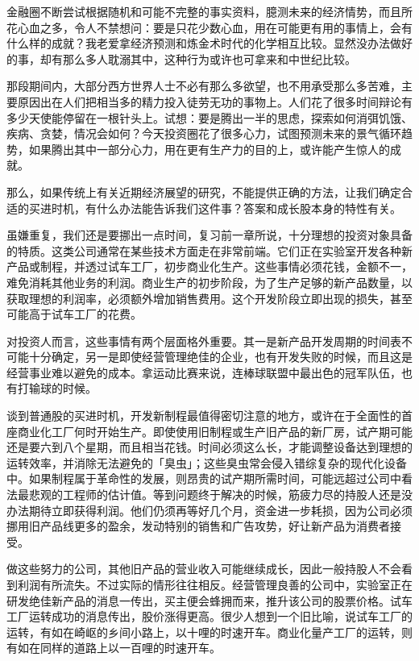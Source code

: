 \documentclass[UTF8,a4paper,zihao=-4,fontset = windows]{ctexart} %
\begin{document}
金融圈不断尝试根据随机和可能不完整的事实资料，臆测未来的经济情势，而且所花心血之多，令人不禁想问：要是只花少数心血，用在可能更有用的事情上，会有什么样的成就？我老爱拿经济预测和炼金术时代的化学相互比较。显然没办法做好的事，却有那么多人耽溺其中，这种行为或许也可拿来和中世纪比较。

那段期间内，大部分西方世界人士不必有那么多欲望，也不用承受那么多苦难，主要原因出在人们把相当多的精力投入徒劳无功的事物上。人们花了很多时间辩论有多少天使能停留在一根针头上。试想：要是腾出一半的思虑，探索如何消弭饥饿、疾病、贪婪，情况会如何？今天投资圈花了很多心力，试图预测未来的景气循环趋势，如果腾出其中一部分心力，用在更有生产力的目的上，或许能产生惊人的成就。

那么，如果传统上有关近期经济展望的研究，不能提供正确的方法，让我们确定合适的买进时机，有什么办法能告诉我们这件事？答案和成长股本身的特性有关。

虽嫌重复，我们还是要挪出一点时间，复习前一章所说，十分理想的投资对象具备的特质。这类公司通常在某些技术方面走在非常前端。它们正在实验室开发各种新产品或制程，并透过试车工厂，初步商业化生产。这些事情必须花钱，金额不一，难免消耗其他业务的利润。商业生产的初步阶段，为了生产足够的新产品数量，以获取理想的利润率，必须额外增加销售费用。这个开发阶段立即出现的损失，甚至可能高于试车工厂的花费。

对投资人而言，这些事情有两个层面格外重要。其一是新产品开发周期的时间表不可能十分确定，另一是即使经营管理绝佳的企业，也有开发失败的时候，而且这是经营事业难以避免的成本。拿运动比赛来说，连棒球联盟中最出色的冠军队伍，也有打输球的时候。

谈到普通股的买进时机，开发新制程最值得密切注意的地方，或许在于全面性的首座商业化工厂何时开始生产。即使使用旧制程或生产旧产品的新厂房，试产期可能还是要六到八个星期，而且相当花钱。时间必须这么长，才能调整设备达到理想的运转效率，并消除无法避免的「臭虫」；这些臭虫常会侵入错综复杂的现代化设备中。如果制程属于革命性的发展，则昂贵的试产期所需时间，可能远超过公司中看法最悲观的工程师的估计值。等到问题终于解决的时候，筋疲力尽的持股人还是没办法期待立即获得利润。他们仍须再等好几个月，资金进一步耗损，因为公司必须挪用旧产品线更多的盈余，发动特别的销售和广告攻势，好让新产品为消费者接受。

做这些努力的公司，其他旧产品的营业收入可能继续成长，因此一般持股人不会看到利润有所流失。不过实际的情形往往相反。经营管理良善的公司中，实验室正在研发绝佳新产品的消息一传出，买主便会蜂拥而来，推升该公司的股票价格。试车工厂运转成功的消息传出，股价涨得更高。很少人想到一个旧比喻，说试车工厂的运转，有如在崎岖的乡间小路上，以十哩的时速开车。商业化量产工厂的运转，则有如在同样的道路上以一百哩的时速开车。
\end{document}
